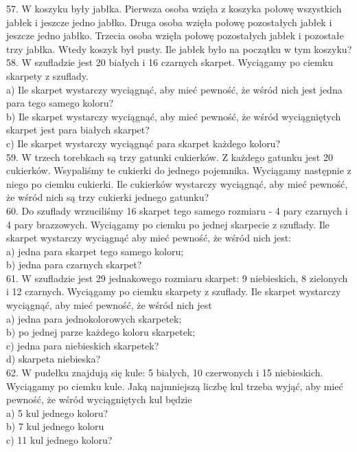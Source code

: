 \documentclass[10pt]{article}
\begin{document}
57. W koszyku były jabłka. Pierwsza osoba wzięła z koszyka połowę wszystkich jabłek i jeszcze jedno jabłko. Druga osoba wzięła połowę pozostałych jabłek i jeszcze jedno jabłko. Trzecia osoba wzięła połowę pozostałych jabłek i pozostałe trzy jabłka. Wtedy koszyk był pusty. Ile jabłek było na początku w tym koszyku?\\
58. W szufladzie jest 20 białych i 16 czarnych skarpet. Wyciągamy po ciemku skarpety z szuflady.\\
a) Ile skarpet wystarczy wyciągnąć, aby mieć pewność, że wśród nich jest jedna para tego samego koloru?\\
b) Ile skarpet wystarczy wyciągnąć, aby mieć pewność, że wśród wyciągniętych skarpet jest para białych skarpet?\\
c) Ile skarpet wystarczy wyciągnąć para skarpet każdego koloru?\\
59. W trzech torebkach są trzy gatunki cukierków. Z każdego gatunku jest 20 cukierków. Wsypaliśmy te cukierki do jednego pojemnika. Wyciągamy następnie z niego po ciemku cukierki. Ile cukierków wystarczy wyciągnąć, aby mieć pewność, że wśród nich są trzy cukierki jednego gatunku?\\
60. Do szuflady wrzuciliśmy 16 skarpet tego samego rozmiaru - 4 pary czarnych i 4 pary brazzowych. Wyciągamy po ciemku po jednej skarpecie z szuflady. Ile skarpet wystarczy wyciągnąć aby mieć pewność, że wśród nich jest:\\
a) jedna para skarpet tego samego koloru;\\
b) jedna para czarnych skarpet?\\
61. W szufladzie jest 29 jednakowego rozmiaru skarpet: 9 niebieskich, 8 zielonych i 12 czarnych. Wyciągamy po ciemku skarpety z szuflady. Ile skarpet wystarczy wyciągnąć, aby mieć pewność, że wśród nich jest\\
a) jedna para jednokolorowych skarpetek;\\
b) po jednej parze każdego koloru skarpetek;\\
c) jedna para niebieskich skarpetek?\\
d) skarpeta niebieska?\\
62. W pudełku znajdują się kule: 5 białych, 10 czerwonych i 15 niebieskich. Wyciągamy po ciemku kule. Jaką najmniejszą liczbę kul trzeba wyjąć, aby mieć pewność, że wśród wyciągniętych kul będzie\\
a) 5 kul jednego koloru?\\
b) 7 kul jednego koloru\\
c) 11 kul jednego koloru?\\
\end{document}
